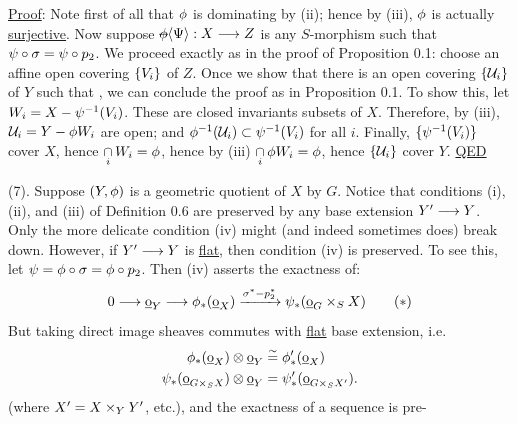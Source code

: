 
\uline{Proof}: Note first of all that $\phi$ is dominating by (ii); hence by (iii), $\phi$ is actually \uline{surjective}. Now suppose $\deleted{\handwritten{\phi}}\inserted{\handwritten{\Psi}}:X\handwritten{\longrightarrow} Z$ is any $S$-morphism such that $\psi\circ\sigma=\psi\circ p_2$. We proceed exactly as in the proof of Proposition 0.1: choose an affine open covering $\{V_i\}$ of $Z$. Once we show that there is an open covering $\{\mathcal U_i\}$ of $Y$ such that , we can conclude the proof as in Proposition 0.1. To show this, let $W_i=X-\psi^{-1}(V_i)$. These are closed invariants subsets of $X$. Therefore, by (iii), $\mathcal U_i=Y-\phi W_i$ are open; and $\phi^{-1}(\mathcal U_i)\subset\psi^{-1}(V_i)$ for all $i$. Finally, $\{\psi^{-1}(V_i)\}$ cover $X$, hence $\underset{i}{\cap}\,W_i=\phi$, hence by (iii) $\underset{i}{\cap}\,\phi W_i=\phi$, hence $\{\mathcal U_i\}$ cover $Y$. \uline{QED}

(7). Suppose $(Y,\phi)$ is a geometric quotient of $X$ by $G$. Notice that conditions (i), (ii), and (iii) of Definition 0.6 are preserved by any base extension $Y^{\prime}\longrightarrow Y$. Only the more delicate condition (iv) might (and indeed sometimes does) break down. However, if $Y^{\prime}\longrightarrow Y$ is \uline{flat}, then condition (iv) is preserved. To see this, let $\psi=\phi\circ\sigma=\phi\circ p_2$. Then (iv) asserts the exactness of:
\[
0\longrightarrow \underline{\mathrm{o}}_Y\longrightarrow \phi_*(\underline{\mathrm{o}}_X)\xrightarrow{\sigma^*-p_2^*}\psi_*(\underline{\mathrm{o}}_G\times_S X)
\tag*{$(*)$}
\]
But taking direct image sheaves commutes with \uline{flat} base extension, i.e.
\[
\begin{aligned}
\phi_*(\underline{\mathrm{o}}_X)\otimes\underline{\mathrm{o}}_Y &\mathrel{\overset{\sim}{=}}\phi^{\prime}_*(\underline{\mathrm{o}}_X)\\
\psi_*(\underline{\mathrm{o}}_{G\times_S X})\otimes\underline{\mathrm{o}}_Y &=\psi^{\prime}_*(\underline{\mathrm{o}}_{G\times_S X^{\prime}}).
\end{aligned}
\]
(where $X^{\prime}=X\times_Y Y^{\prime}$, etc.), and the exactness of a sequence is pre-

